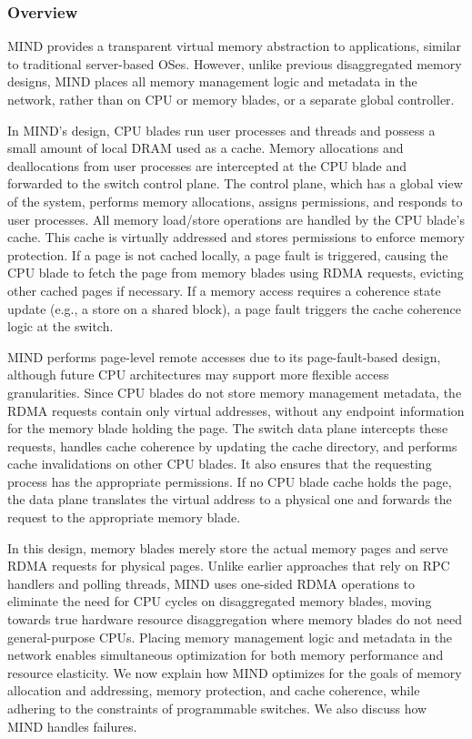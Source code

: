 \subsubsection{Overview}
MIND provides a transparent virtual memory abstraction to applications, similar to traditional server-based OSes. However, unlike previous disaggregated memory designs, MIND places all memory management logic and metadata in the network, rather than on CPU or memory blades, or a separate global controller.

In MIND's design, CPU blades run user processes and threads and possess a small amount of local DRAM used as a cache. Memory allocations and deallocations from user processes are intercepted at the CPU blade and forwarded to the switch control plane. The control plane, which has a global view of the system, performs memory allocations, assigns permissions, and responds to user processes. All memory load/store operations are handled by the CPU blade's cache. This cache is virtually addressed and stores permissions to enforce memory protection. If a page is not cached locally, a page fault is triggered, causing the CPU blade to fetch the page from memory blades using RDMA requests, evicting other cached pages if necessary. If a memory access requires a coherence state update (e.g., a store on a shared block), a page fault triggers the cache coherence logic at the switch.

MIND performs page-level remote accesses due to its page-fault-based design, although future CPU architectures may support more flexible access granularities. Since CPU blades do not store memory management metadata, the RDMA requests contain only virtual addresses, without any endpoint information for the memory blade holding the page. The switch data plane intercepts these requests, handles cache coherence by updating the cache directory, and performs cache invalidations on other CPU blades. It also ensures that the requesting process has the appropriate permissions. If no CPU blade cache holds the page, the data plane translates the virtual address to a physical one and forwards the request to the appropriate memory blade.

In this design, memory blades merely store the actual memory pages and serve RDMA requests for physical pages. Unlike earlier approaches that rely on RPC handlers and polling threads, MIND uses one-sided RDMA operations to eliminate the need for CPU cycles on disaggregated memory blades, moving towards true hardware resource disaggregation where memory blades do not need general-purpose CPUs.
Placing memory management logic and metadata in the network enables simultaneous optimization for both memory performance and resource elasticity. We now explain how MIND optimizes for the goals of memory allocation and addressing, memory protection, and cache coherence, while adhering to the constraints of programmable switches. We also discuss how MIND handles failures.

